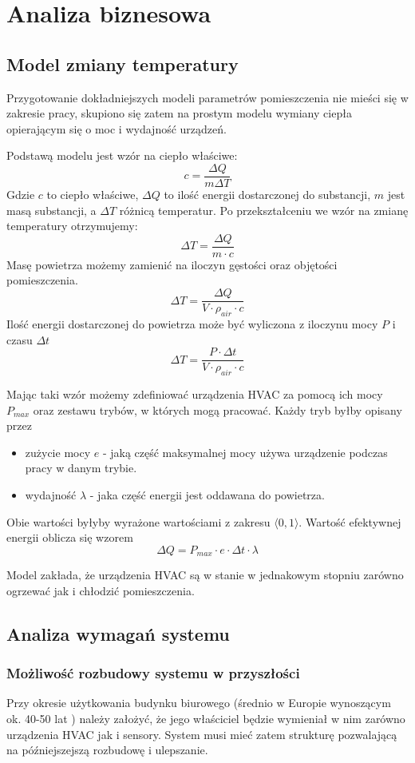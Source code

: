 \chapter{Analiza biznesowa}

\section{Model zmiany temperatury}
Przygotowanie dokładniejszych modeli parametrów pomieszczenia nie mieści się w zakresie pracy, skupiono się zatem na prostym modelu wymiany ciepła opierającym się o moc i wydajność urządzeń.

Podstawą modelu jest wzór na ciepło właściwe:
$$ c = \frac{\Delta Q}{m \Delta T} $$
Gdzie $c$ to ciepło właściwe, $\Delta Q$ to ilość energii dostarczonej do substancji, $m$ jest masą substancji, a $\Delta T$ różnicą temperatur.
Po przekształceniu we wzór na zmianę temperatury otrzymujemy:
$$ \Delta T = \frac{\Delta Q}{m \cdot c} $$
Masę powietrza możemy zamienić na iloczyn gęstości oraz objętości pomieszczenia.
$$ \Delta T = \frac{\Delta Q}{V \cdot \rho_{air} \cdot c} $$
Ilość energii dostarczonej do powietrza może być wyliczona z iloczynu mocy $P$ i czasu $\Delta t$
$$ \Delta T = \frac{P \cdot \Delta t}{V \cdot \rho_{air} \cdot c} $$

Mając taki wzór możemy zdefiniować urządzenia HVAC za pomocą ich mocy $P_{max}$ oraz zestawu trybów, w których mogą pracować.
Każdy tryb byłby opisany przez 
\begin{itemize}
    \item zużycie mocy $e$ - jaką część maksymalnej mocy używa urządzenie podczas pracy w danym trybie. 
    \item wydajność $\lambda$ - jaka część energii jest oddawana do powietrza. 
\end{itemize}
Obie wartości byłyby wyrażone wartościami z zakresu $\langle 0,1 \rangle$. Wartość efektywnej energii oblicza się wzorem
$$ \Delta Q = P_{max} \cdot e \cdot \Delta t \cdot \lambda $$

Model zakłada, że urządzenia HVAC są w stanie w jednakowym stopniu zarówno ogrzewać jak i chłodzić pomieszczenia. 

\section{Analiza wymagań systemu}
\subsection*{Możliwość rozbudowy systemu w przyszłości}
Przy okresie użytkowania budynku biurowego (średnio w Europie wynoszącym ok. 40-50 lat \cite{bib:wiekBudynku}) należy założyć, że jego właściciel będzie wymieniał w nim zarówno urządzenia HVAC jak i sensory. System musi mieć zatem strukturę pozwalającą na późniejszejszą rozbudowę i ulepszanie. 

